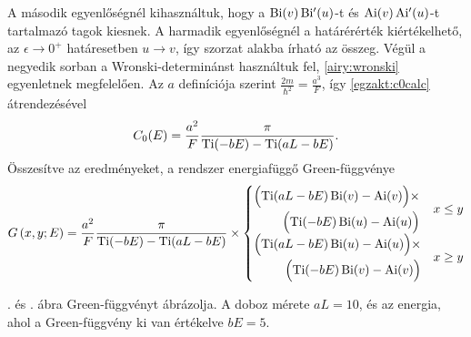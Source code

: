 A második egyenlőségnél kihasználtuk, hogy a $\operatorname{Bi}(v)\operatorname{Bi^\prime}(u)$-t és $\operatorname{Ai}(v)\operatorname{Ai^\prime}(u)$-t tartalmazó tagok kiesnek. A harmadik egyenlőségnél a határérérték kiértékelhető, az $\epsilon\to 0^+$ határesetben $u\to v$, így szorzat alakba írható az összeg. Végül a negyedik sorban a Wronski-determinánst használtuk fel, \eqref{airy:wronski} egyenletnek megfelelően. Az $a$ definíciója szerint $\frac{2m}{\hbar^2}=\frac{a^3}{F}$, így \eqref{egzakt:c0calc} átrendezésével
\begin{equation}
	C_0(E) = \frac{a^2}{F}\frac{\pi}{\operatorname{Ti}(-bE)-\operatorname{Ti}(aL-bE)}.
\end{equation}
Összesítve az eredményeket, a rendszer energiafüggő Green-függvénye
\begin{equation}
	G\left(x,y;E\right) = \frac{a^2}{F}\frac{\pi}{\operatorname{Ti}(-bE)-\operatorname{Ti}(aL-bE)}\times
	\begin{cases}
		\begin{split}
			\Bigl(\operatorname{Ti}(aL-bE)\operatorname{Bi}(v)-\operatorname{Ai}(v)\Bigr)\times\\
			\Bigl(\operatorname{Ti}(-bE)\operatorname{Bi}(u)-\operatorname{Ai}(u)\Bigr)
		\end{split}& x \leq y\\
		\begin{split}
			\Bigl(\operatorname{Ti}(aL-bE)\operatorname{Bi}(u)-\operatorname{Ai}(u)\Bigr)\times\\
			\Bigl(\operatorname{Ti}(-bE)\operatorname{Bi}(v)-\operatorname{Ai}(v)\Bigr)
		\end{split}& x \geq y
	\end{cases}
	\label{egzakt:greenfunction}
\end{equation}

. és . ábra  Green-függvényt ábrázolja. A doboz mérete $aL=10$, és az energia, ahol a Green-függvény ki van értékelve $bE=5$.

